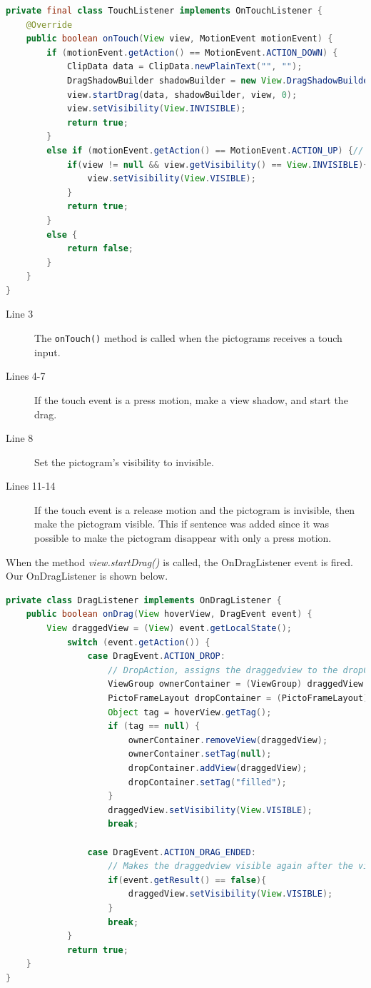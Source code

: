 \begin{lstlisting}[language=java,firstnumber=1,caption={Our TouchListener},label=lst:ourtouchlistener] 
private final class TouchListener implements OnTouchListener {
	@Override
	public boolean onTouch(View view, MotionEvent motionEvent) {
		if (motionEvent.getAction() == MotionEvent.ACTION_DOWN) {
			ClipData data = ClipData.newPlainText("", "");
			DragShadowBuilder shadowBuilder = new View.DragShadowBuilder(view);
			view.startDrag(data, shadowBuilder, view, 0);
			view.setVisibility(View.INVISIBLE);
			return true;
		}
		else if (motionEvent.getAction() == MotionEvent.ACTION_UP) {// prevents that a pictogram disappears if only pressed and no drag
			if(view != null && view.getVisibility() == View.INVISIBLE){
				view.setVisibility(View.VISIBLE);
			}
			return true;
		}
		else {
			return false;
		}
	}
}
\end{lstlisting}
\begin{description}
\item[Line 3] The \lstinline|onTouch()| method is called when the pictograms receives a touch input.
\item[Lines 4-7] If the touch event is a press motion, make a view shadow, and start the drag.
\item[Line 8] Set the pictogram's visibility to invisible.
\item[Lines 11-14] If the touch event is a release motion and the pictogram is invisible, then make the pictogram visible. This if sentence was added since it was possible to make the pictogram disappear with only a press motion.
\end{description}
When the method \textit{view.startDrag()} is called, the OnDragListener event is fired. Our OnDragListener is shown below.
\begin{lstlisting}[language=java,firstnumber=1,caption={Our DragListener},label=lst:ourdraglistener] 
private class DragListener implements OnDragListener {
	public boolean onDrag(View hoverView, DragEvent event) {
	    View draggedView = (View) event.getLocalState();
			switch (event.getAction()) {
				case DragEvent.ACTION_DROP:
					// DropAction, assigns the draggedview to the dropContainer if, the dropContainer does not already contain a pictogram.
					ViewGroup ownerContainer = (ViewGroup) draggedView.getParent();
					PictoFrameLayout dropContainer = (PictoFrameLayout) hoverView;
					Object tag = hoverView.getTag();
					if (tag == null) {
						ownerContainer.removeView(draggedView);
						ownerContainer.setTag(null);
						dropContainer.addView(draggedView);
						dropContainer.setTag("filled");
					}
					draggedView.setVisibility(View.VISIBLE);
					break;

				case DragEvent.ACTION_DRAG_ENDED:
					// Makes the draggedview visible again after the view has been moved or if drop wasn't valid.
					if(event.getResult() == false){
						draggedView.setVisibility(View.VISIBLE);
					}
					break;
			}
			return true;
	}
}
\end{lstlisting}
